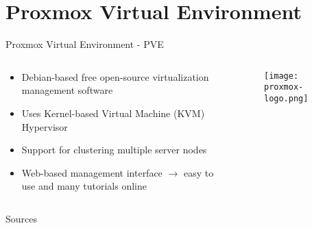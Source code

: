 \section{Proxmox Virtual Environment}

\begin{frame}{Proxmox Virtual Environment - PVE}
    \begin{columns}
        \begin{column}{0.6\linewidth}
            \begin{itemize}
                \item Debian-based free open-source virtualization management software
                \item Uses Kernel-based Virtual Machine (KVM) Hypervisor
                \item Support for clustering multiple server nodes
                \item Web-based management interface $\rightarrow$ easy to use and many tutorials online
            \end{itemize}
        \end{column}
        \begin{column}{0.4\linewidth}
            \begin{figure}
                \centering
                \texttt{[image: proxmox-logo.png]}\\
                \cite{proxmox-logo}
            \end{figure}
        \end{column}
    \end{columns}
\end{frame}

\begin{frame}{Sources}
    \printbibliography[title = {Sources}, heading = none]
\end{frame}